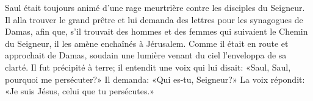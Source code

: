 Saul était toujours animé d’une rage meurtrière contre les disciples du Seigneur.
Il alla trouver le grand prêtre et lui demanda des lettres pour les synagogues de Damas,
	afin que, s’il trouvait des hommes et des femmes qui suivaient le Chemin du Seigneur,
	il les amène enchaînés à Jérusalem.
Comme il était en route et approchait de Damas,
	soudain une lumière venant du ciel l’enveloppa de sa clarté.
Il fut précipité à terre; il entendit une voix qui lui disait:
	«Saul, Saul, pourquoi me persécuter?»
Il demanda: «Qui es-tu, Seigneur?»
La voix répondit: «Je suis Jésus, celui que tu persécutes.»
